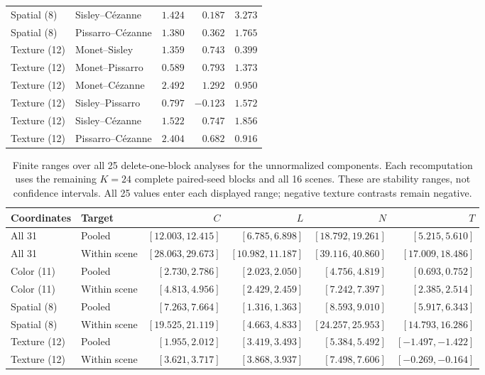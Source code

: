 \begin{table}[!htbp]
\begin{tabularx}{\linewidth}{@{}lXrrr@{}}
Spatial (8) & Sisley--C\'ezanne & $1.424$ & $0.187$ & $3.273$\\
Spatial (8) & Pissarro--C\'ezanne & $1.380$ & $0.362$ & $1.765$\\
\addlinespace[3pt]
Texture (12) & Monet--Sisley & $1.359$ & $0.743$ & $0.399$\\
Texture (12) & Monet--Pissarro & $0.589$ & $0.793$ & $1.373$\\
Texture (12) & Monet--C\'ezanne & $2.492$ & $1.292$ & $0.950$\\
Texture (12) & Sisley--Pissarro & $0.797$ & $-0.123$ & $1.572$\\
Texture (12) & Sisley--C\'ezanne & $1.522$ & $0.747$ & $1.856$\\
Texture (12) & Pissarro--C\'ezanne & $2.404$ & $0.682$ & $0.916$\\
\bottomrule\end{tabularx}\end{table}
\FloatBarrier
\begin{table}[!htbp]
\caption{Finite ranges over all 25 delete-one-block analyses for the unnormalized components. Each recomputation uses the remaining $K=24$ complete paired-seed blocks and all 16 scenes. These are stability ranges, not confidence intervals. All 25 values enter each displayed range; negative texture contrasts remain negative.}
\label{tab:cross-cohort-delete-energy}
\centering\small\setlength{\tabcolsep}{4pt}
\begin{tabularx}{\linewidth}{@{}Xlrrrr@{}}\toprule
Coordinates & Target & $C$ & $L$ & $N$ & $T$\\\midrule
All 31 & Pooled & $[12.003, 12.415]$ & $[6.785, 6.898]$ & $[18.792, 19.261]$ & $[5.215, 5.610]$\\
All 31 & Within scene & $[28.063, 29.673]$ & $[10.982, 11.187]$ & $[39.116, 40.860]$ & $[17.009, 18.486]$\\
\addlinespace[2pt]
Color (11) & Pooled & $[2.730, 2.786]$ & $[2.023, 2.050]$ & $[4.756, 4.819]$ & $[0.693, 0.752]$\\
Color (11) & Within scene & $[4.813, 4.956]$ & $[2.429, 2.459]$ & $[7.242, 7.397]$ & $[2.385, 2.514]$\\
\addlinespace[2pt]
Spatial (8) & Pooled & $[7.263, 7.664]$ & $[1.316, 1.363]$ & $[8.593, 9.010]$ & $[5.917, 6.343]$\\
Spatial (8) & Within scene & $[19.525, 21.119]$ & $[4.663, 4.833]$ & $[24.257, 25.953]$ & $[14.793, 16.286]$\\
\addlinespace[2pt]
Texture (12) & Pooled & $[1.955, 2.012]$ & $[3.419, 3.493]$ & $[5.384, 5.492]$ & $[-1.497, -1.422]$\\
Texture (12) & Within scene & $[3.621, 3.717]$ & $[3.868, 3.937]$ & $[7.498, 7.606]$ & $[-0.269, -0.164]$\\
\bottomrule\end{tabularx}\end{table}
